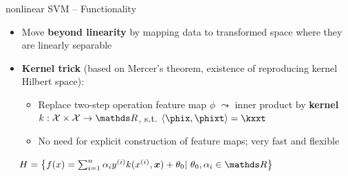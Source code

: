 \begin{frame}{nonlinear SVM -- Functionality}

\footnotesize

  

\medskip

\begin{itemize}
  \item Move \textbf{beyond linearity} by mapping data to 
  transformed space where they are linearly separable
  \item \textbf{Kernel trick} (based on Mercer's theorem, existence of 
  reproducing kernel Hilbert space): 
  \begin{itemize}
    \item Replace two-step operation feature map $\phi$ $\leadsto$ inner product 
    by \textbf{kernel} $k: \Xspace \times \Xspace \rightarrow \R$, s.t.
    $\scp{\phix}{\phixt} = \kxxt$
    \item No need for explicit construction of feature maps; very fast and 
    flexible
  \end{itemize}
\end{itemize}

\medskip


 ~~
$\Hspace = \left \{ \fx = \sumin \alpha_i \yi k(\xi, \xv)  + \theta_0 |\ 
\theta_0, \alpha_i \in \R \right \} $


\end{frame}
